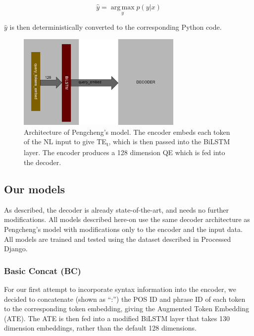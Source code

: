 \documentclass{IEEEtran}
\begin{document}
      \begin{equation}
        \label{eq:pengcheng}
        \hat{y} = \operatorname*{arg\,max}_y p(y\vert x)
      \end{equation}

      $ \hat{y} $ is then deterministically converted to the corresponding Python code.

      \begin{figure}[h]
        \centering
        \includegraphics[width=8cm]{pengcheng.png}
        \caption{Architecture of Pengcheng's model. The encoder embeds each token of the NL input
        to give TE\textsubscript{t}, which is then passed into the BiLSTM layer. The encoder
        produces a 128 dimension QE which is fed into the decoder.}
        \label{fig:pengcheng}
      \end{figure}

      \subsection{Our models}
      As described, the decoder is already state-of-the-art, and needs no further 
      modifications. All models described here-on use the same decoder architecture as Pengcheng's 
      model with modifications only to the encoder and the input data. All models are 
      trained and tested using the dataset described in Processed Django. \\

        \subsubsection{Basic Concat (BC)}
        For our first attempt to incorporate syntax information into the encoder, we decided to 
        concatenate (shown as ``:'') the POS ID and phrase ID of each token to the corresponding 
        token embedding, giving the Augmented Token Embedding (ATE). The ATE is then fed into 
        a modified BiLSTM layer that takes 130 dimension embeddings, rather than the default 128 
        dimensions. \\
\end{document}
